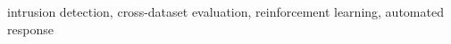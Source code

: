 \begin{abstract}
\end{abstract}
\begin{IEEEkeywords}
intrusion detection, cross-dataset evaluation, reinforcement learning, automated response
\end{IEEEkeywords}
